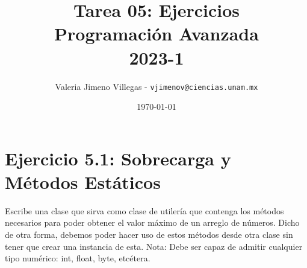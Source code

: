 \documentclass[11pt, oneside]{article}
\title{Tarea 05: Ejercicios \\[5pt] \normalsize Programación Avanzada  \\[5pt] 2023-1 }
\author{Valeria Jimeno Villegas - \texttt{vjimenov@ciencias.unam.mx}}
\date{\today}
\begin{document}
\maketitle

\section*{Ejercicio 5.1: Sobrecarga y Métodos Estáticos}

\noindent Escribe una clase que sirva como clase de utilería que contenga los métodos necesarios para poder obtener el valor máximo de un arreglo de números. Dicho de otra forma, debemos poder hacer uso de estos métodos desde otra clase sin tener que crear una instancia de esta. Nota: Debe ser capaz de admitir cualquier tipo numérico: int, float, byte, etcétera.
\end{document}
